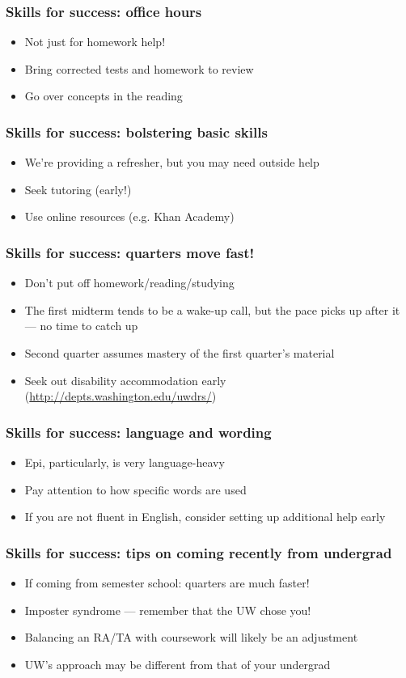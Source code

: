 \documentclass[12pt]{beamer}
\newcommand{\myframe}[1]{\begin{frame} \frametitle{#1}}
\newenvironment{spaceitemize}
{ \begin{itemize}
    \setlength{\itemsep}{10pt}
    \setlength{\parskip}{0pt}
    \setlength{\parsep}{0pt}     }
{ \end{itemize}                  }
\begin{document}
\myframe{Skills for success: office hours}
\begin{spaceitemize}
\item Not just for homework help!
\item Bring corrected tests and homework to review
\item Go over concepts in the reading
\end{spaceitemize}
\end{frame}

\myframe{Skills for success: bolstering basic skills}
\begin{spaceitemize}
\item We're providing a refresher, but you may need outside help
\item Seek tutoring (early!)
\item Use online resources (e.g. Khan Academy)
\end{spaceitemize}
\end{frame}

\myframe{Skills for success: quarters move fast!}
\begin{spaceitemize}
\item Don't put off homework/reading/studying
\item The first midterm tends to be a wake-up call, but the pace picks up after it --- no time to catch up
\item Second quarter assumes mastery of the first quarter's material
\item Seek out disability accommodation early (\url{http://depts.washington.edu/uwdrs/})
\end{spaceitemize}
\end{frame}

\myframe{Skills for success: language and wording}
\begin{spaceitemize}
\item Epi, particularly, is very language-heavy
\item Pay attention to how specific words are used
\item If you are not fluent in English, consider setting up additional help early
\end{spaceitemize}
\end{frame}

\myframe{Skills for success: tips on coming recently from undergrad}
\begin{spaceitemize}
\item If coming from semester school: quarters are much faster!
\item Imposter syndrome --- remember that the UW chose you!
\item Balancing an RA/TA with coursework will likely be an adjustment
\item UW's approach may be different from that of your undergrad
\end{spaceitemize}
\end{frame}
\end{document}
